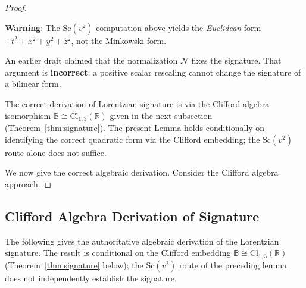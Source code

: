 \documentclass[12pt]{article}
\theoremstyle{definition}
\theoremstyle{remark}
\begin{document}
\begin{proof}
%

\begin{tcolorbox}[colback=red!5!white,colframe=red!75!black,
  title={Failed Approach — Euclidean Result (Kept for Transparency)}]
\textbf{Warning}: The $\mathrm{Sc}(v^2)$ computation above yields the
\emph{Euclidean} form $+t^2+x^2+y^2+z^2$, not the Minkowski form.

An earlier draft claimed that the normalization $\mathcal{N}$ fixes the signature.
That argument is \textbf{incorrect}: a positive scalar rescaling cannot change the
signature of a bilinear form.

\medskip
The correct derivation of Lorentzian signature is via the Clifford algebra
isomorphism $\mathbb{B}\cong\mathrm{Cl}_{1,3}(\mathbb{R})$ given in the next
subsection (Theorem~\ref{thm:signature}).  The present Lemma holds conditionally
on identifying the correct quadratic form via the Clifford embedding; the
$\mathrm{Sc}(v^2)$ route alone does not suffice.
\end{tcolorbox}

\medskip
We now give the correct algebraic derivation.  Consider the Clifford algebra approach.
\end{proof}

\subsection{Clifford Algebra Derivation of Signature}

The following gives the authoritative algebraic derivation of the Lorentzian signature.
The result is conditional on the Clifford embedding $\mathbb{B}\cong\mathrm{Cl}_{1,3}(\mathbb{R})$
(Theorem~\ref{thm:signature} below); the $\mathrm{Sc}(v^2)$ route of the preceding
lemma does not independently establish the signature.
\end{document}
